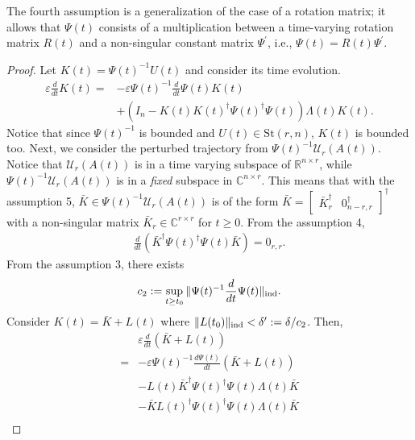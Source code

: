 \documentclass[fleqn,10pt]{SICE_FES26}
\begin{document}
    The fourth assumption is a generalization of the case of a rotation matrix; it allows that $\Psi (t)$ consists of a multiplication between a time-varying rotation matrix $R(t)$ and a non-singular constant matrix $\Psi ^{\prime}$, i.e., $\Psi (t) = R(t) \Psi ^{\prime}$. 
    
    \begin{proof}
    Let $K (t) = \Psi (t)^{-1} U(t)$ and consider its time evolution. 
	\begin{align*}
	\varepsilon \frac{d}{dt} K(t) 
	=& - \varepsilon \Psi (t) ^{-1} \frac{d}{dt}\Psi (t) K(t) 
	\\ & 
	+ (I_{n} - K(t)K(t)^{\dagger} \Psi (t)^{\dagger} \Psi (t)  ) \Lambda (t) K(t).
	\end{align*}
    Notice that since $\Psi (t)^{-1}$ is bounded and $U(t) \in {\mathrm{St}}(r,n)$, $K(t)$ is bounded too. 
	Next, we consider the perturbed trajectory from $\Psi (t) ^{-1} {\mathcal{U}}_{r}(A(t))$. 
	Notice that ${\mathcal{U}}_{r}(A(t))$ is in a time varying subspace of ${\mathbb{R}}^{n\times r}$, while $\Psi (t) ^{-1} {\mathcal{U}}_{r}(A(t))$ is in a {\em fixed} subspace in ${\mathbb{C}}^{n\times r}$. 
	This means that with the assumption 5, $\bar{K} \in \Psi (t) ^{-1} {\mathcal{U}}_{r}(A(t))$ is of the form $\bar{K} = \begin{bmatrix}  \bar{K}_{r}^{\dagger}  & 0_{n-r,r}^{\dagger}  \end{bmatrix} ^{\dagger}$ with a non-singular matrix $\bar{K}_{r} \in {\mathbb{C}}^{r\times r}$ for $t\geq 0$. 
	From the assumption 4, 
	\begin{align*}
	\frac{d}{dt} ( \bar{K}^{\dagger} \Psi (t) ^{\dagger} \Psi (t) \bar{K})
	=
	0_{r,r}
	.
	\end{align*}
	From the assumption 3, there exists 
	\begin{align*}c_{2} := \sup _{t\geq t_{0}} \|  \Psi (t) ^{-1}  \frac{d}{dt}\Psi (t) \|  _{\rm ind}. 
	\end{align*}
	Consider $K(t) = \bar{K} + L (t) $ where $\| L (t_{0}) \| _{\rm ind} < \delta ^{\prime} := \delta /c_{2}$. 
	Then, 
	\begin{align*}
	& \varepsilon \frac{d}{dt} (\bar{K} + L(t) ) 
	\\
	= &  -\varepsilon \Psi (t) ^{-1} \frac{d\Psi (t)}{dt} ( \bar{K} +L(t)  ) 
	\\ & 
	- L(t)\bar{K}^{\dagger} \Psi (t)^{\dagger} \Psi (t)   \Lambda (t) \bar{K}
	\\ &
	- \bar{K} L(t)^{\dagger} \Psi (t)^{\dagger} \Psi (t)  \Lambda (t) \bar{K} 
	\\ & 

\end{align*}
\end{proof}
\end{document}

